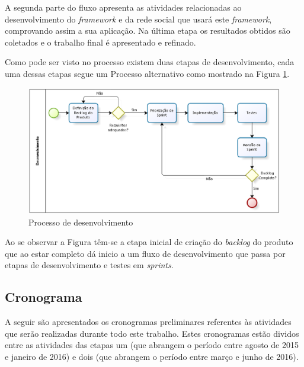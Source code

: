 A segunda parte do fluxo apresenta as atividades relacionadas ao desenvolvimento do \textit{framework} e da rede social que usará este \textit{framework}, comprovando assim a sua aplicação. Na última etapa os resultados obtidos são coletados e o trabalho final é apresentado e refinado.

Como pode ser visto no processo existem duas etapas de desenvolvimento, cada uma dessas etapas segue um Processo alternativo como mostrado na Figura \ref{Processo desenvolvimento}.

\begin{figure}[h]
	\centering
	\includegraphics[scale=0.4]{figuras/capitulo4/processo_desenvolvimento.eps}
	\caption{Processo de desenvolvimento}
	\label{Processo desenvolvimento}
\end{figure}

Ao se observar a Figura têm-se a etapa inicial de criação do \textit{backlog} do produto que ao estar completo dá inicio a um fluxo de desenvolvimento que passa por etapas de desenvolvimento e testes em \textit{sprints}.

\subsection{Cronograma}

A seguir são apresentados os cronogramas preliminares referentes às atividades que serão realizadas durante todo este trabalho. Estes cronogramas estão dividos entre as atividades das etapas um (que abrangem o período entre agosto de 2015 e janeiro de 2016) e dois (que abrangem o período entre março e junho de 2016).

